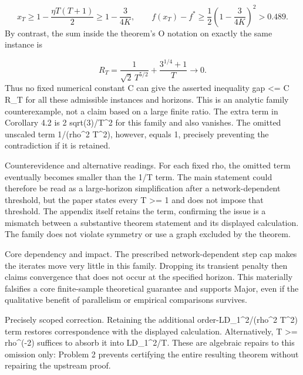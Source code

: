 \documentclass[10pt]{article}
\begin{document}
\[x_T\ge 1-\frac{\eta T(T+1)}2
\ge 1-\frac3{4K},\qquad
f(x_T)-f^*\ge\frac12\left(1-\frac3{4K}\right)^2
>0.489.\] By contrast, the sum inside the theorem’s O notation on exactly the same instance is\par
\[R_T=\frac1{\sqrt2\,T^{5/2}}+
\frac{3^{1/4}+1}{T}\longrightarrow0.\] Thus no fixed numerical constant C can give the asserted inequality gap <= C R\_T for all these admissible instances and horizons. This is an analytic family counterexample, not a claim based on a large finite ratio. The extra term in Corollary 4.2 is 2 sqrt(3)/T\textasciicircum{}2 for this family and also vanishes. The omitted unscaled term 1/(rho\textasciicircum{}2 T\textasciicircum{}2), however, equals 1, precisely preventing the contradiction if it is retained.\par
Counterevidence and alternative readings. For each fixed rho, the omitted term eventually becomes smaller than the 1/T term. The main statement could therefore be read as a large-horizon simplification after a network-dependent threshold, but the paper states every T >= 1 and does not impose that threshold. The appendix itself retains the term, confirming the issue is a mismatch between a substantive theorem statement and its displayed calculation. The family does not violate symmetry or use a graph excluded by the theorem.\par
Core dependency and impact. The prescribed network-dependent step cap makes the iterates move very little in this family. Dropping its transient penalty then claims convergence that does not occur at the specified horizon. This materially falsifies a core finite-sample theoretical guarantee and supports Major, even if the qualitative benefit of parallelism or empirical comparisons survives.\par
Precisely scoped correction. Retaining the additional order-LD\_1\textasciicircum{}2/(rho\textasciicircum{}2 T\textasciicircum{}2) term restores correspondence with the displayed calculation. Alternatively, T >= rho\textasciicircum{}(-2) suffices to absorb it into LD\_1\textasciicircum{}2/T. These are algebraic repairs to this omission only: Problem 2 prevents certifying the entire resulting theorem without repairing the upstream proof.\par
\end{document}
